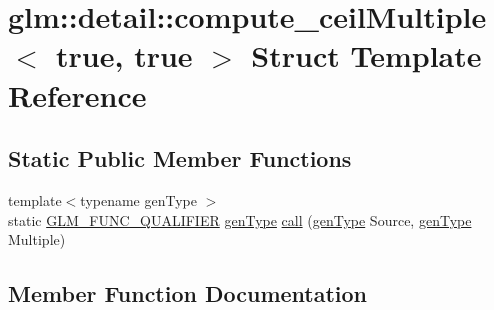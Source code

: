 \hypertarget{structglm_1_1detail_1_1compute__ceil_multiple_3_01true_00_01true_01_4}{}\section{glm\+:\+:detail\+:\+:compute\+\_\+ceil\+Multiple$<$ true, true $>$ Struct Template Reference}
\label{structglm_1_1detail_1_1compute__ceil_multiple_3_01true_00_01true_01_4}
\subsection*{Static Public Member Functions}
\begin{DoxyCompactItemize}
\item 
{\footnotesize template$<$typename gen\+Type $>$ }\\static \mbox{\hyperlink{setup_8hpp_a33fdea6f91c5f834105f7415e2a64407}{G\+L\+M\+\_\+\+F\+U\+N\+C\+\_\+\+Q\+U\+A\+L\+I\+F\+I\+ER}} \mbox{\hyperlink{structglm_1_1detail_1_1gen_type}{gen\+Type}} \mbox{\hyperlink{structglm_1_1detail_1_1compute__ceil_multiple_3_01true_00_01true_01_4_a6d9103207c947da13d0319d2d4d071d9}{call}} (\mbox{\hyperlink{structglm_1_1detail_1_1gen_type}{gen\+Type}} Source, \mbox{\hyperlink{structglm_1_1detail_1_1gen_type}{gen\+Type}} Multiple)
\end{DoxyCompactItemize}


\subsection{Member Function Documentation}
\mbox{\label{structglm_1_1detail_1_1compute__ceil_multiple_3_01true_00_01true_01_4_a6d9103207c947da13d0319d2d4d071d9}} 
